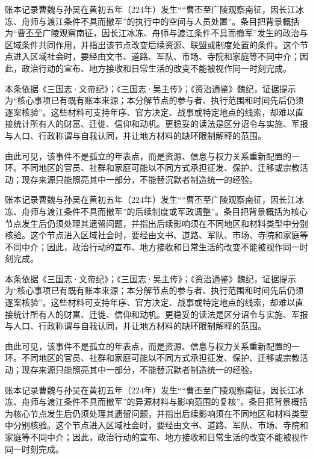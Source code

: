 账本记录曹魏与孙吴在黄初五年（224年）发生““曹丕至广陵观察南征，因长江冰冻、舟师与渡江条件不具而撤军”的执行中的空间与人员处置”。条目把背景概括为“曹丕至广陵观察南征，因长江冰冻、舟师与渡江条件不具而撤军”发生的政治与区域条件共同作用，并指出该节点改变后续资源、联盟或制度处置的条件。这个节点进入区域社会时，要经由文书、道路、军队、市场、寺院和家庭等不同中介；因此，政治行动的宣布、地方接收和日常生活的改变不能被视作同一时刻完成。

本条依据《三国志·文帝纪》；《三国志·吴主传》；《资治通鉴》魏纪，证据提示为“核心事项已有既有账本来源；本分解节点的参与者、执行范围和时间先后仍须逐案核验”。这些材料可支持年序、官方决定、战事或特定地点的线索，却难以直接统计所有人的财富、迁徙、信仰和动机。更稳妥的读法是区分诏令与实施、军报与人口、行政称谓与自我认同，并让地方材料的缺环限制解释的范围。

由此可见，该事件不是孤立的年表点，而是资源、信息与权力关系重新配置的一环。不同地区的官员、社群和家庭可能以不同方式承担征发、保护、迁移或宗教活动；现存来源只能照亮其中一部分，不能替沉默者制造统一的经验。

账本记录曹魏与孙吴在黄初五年（224年）发生““曹丕至广陵观察南征，因长江冰冻、舟师与渡江条件不具而撤军”的后续制度或军政调整”。条目把背景概括为核心节点发生后仍须处理其遗留问题，并指出后续影响须在不同地区和材料类型中分别核验。这个节点进入区域社会时，要经由文书、道路、军队、市场、寺院和家庭等不同中介；因此，政治行动的宣布、地方接收和日常生活的改变不能被视作同一时刻完成。

本条依据《三国志·文帝纪》；《三国志·吴主传》；《资治通鉴》魏纪，证据提示为“核心事项已有既有账本来源；本分解节点的参与者、执行范围和时间先后仍须逐案核验”。这些材料可支持年序、官方决定、战事或特定地点的线索，却难以直接统计所有人的财富、迁徙、信仰和动机。更稳妥的读法是区分诏令与实施、军报与人口、行政称谓与自我认同，并让地方材料的缺环限制解释的范围。

由此可见，该事件不是孤立的年表点，而是资源、信息与权力关系重新配置的一环。不同地区的官员、社群和家庭可能以不同方式承担征发、保护、迁移或宗教活动；现存来源只能照亮其中一部分，不能替沉默者制造统一的经验。

账本记录曹魏与孙吴在黄初五年（224年）发生““曹丕至广陵观察南征，因长江冰冻、舟师与渡江条件不具而撤军”的异源材料与影响范围的复核”。条目把背景概括为核心节点发生后仍须处理其遗留问题，并指出后续影响须在不同地区和材料类型中分别核验。这个节点进入区域社会时，要经由文书、道路、军队、市场、寺院和家庭等不同中介；因此，政治行动的宣布、地方接收和日常生活的改变不能被视作同一时刻完成。


